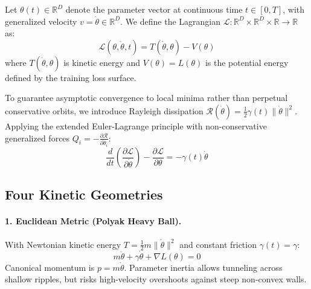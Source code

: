 \documentclass[10pt,twocolumn]{article}
\begin{document}
Let $\theta(t) \in \mathbb{R}^D$ denote the parameter vector at continuous time $t \in [0, T]$, with generalized velocity $v = \dot{\theta} \in \mathbb{R}^D$. We define the Lagrangian $\mathcal{L}: \mathbb{R}^D \times \mathbb{R}^D \times \mathbb{R} \to \mathbb{R}$ as:
\begin{equation}
    \mathcal{L}(\theta, \dot{\theta}, t) = T(\dot{\theta}, \theta) - V(\theta)
\end{equation}
where $T(\dot{\theta}, \theta)$ is kinetic energy and $V(\theta) = L(\theta)$ is the potential energy defined by the training loss surface.

To guarantee asymptotic convergence to local minima rather than perpetual conservative orbits, we introduce Rayleigh dissipation $\mathcal{R}(\dot{\theta}) = \frac{1}{2} \gamma(t) \|\dot{\theta}\|^2$. Applying the extended Euler-Lagrange principle with non-conservative generalized forces $Q_i = -\frac{\partial \mathcal{R}}{\partial \dot{\theta}_i}$:
\begin{equation}
    \frac{d}{dt}\left(\frac{\partial \mathcal{L}}{\partial \dot{\theta}}\right) - \frac{\partial \mathcal{L}}{\partial \theta} = -\gamma(t)\dot{\theta}
    \label{eq:euler_lagrange}
\end{equation}

\subsection{Four Kinetic Geometries}

\paragraph{1. Euclidean Metric (Polyak Heavy Ball).}
With Newtonian kinetic energy $T = \frac{1}{2} m \|\dot{\theta}\|^2$ and constant friction $\gamma(t) = \gamma$:
\begin{equation}
    m \ddot{\theta} + \gamma \dot{\theta} + \nabla L(\theta) = 0
\end{equation}
Canonical momentum is $p = m \dot{\theta}$. Parameter inertia allows tunneling across shallow ripples, but risks high-velocity overshoots against steep non-convex walls.
\end{document}
